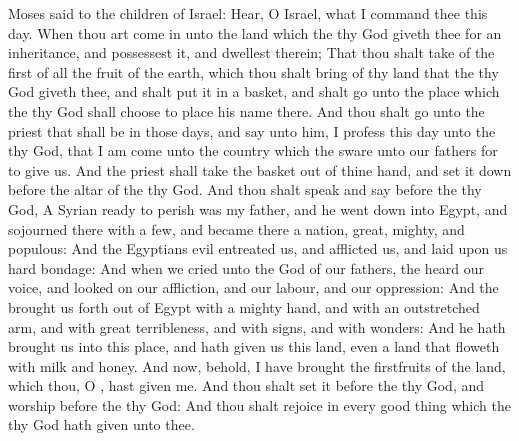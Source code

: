 \vspace{-0.33\baselineskip}


\vspace{-0.1515\baselineskip}

 Moses said to the children of Israel: Hear, O Israel, what I command thee this day. When thou art come in unto the land which the  thy God giveth thee for an inheritance, and possessest it, and dwellest therein; That thou shalt take of the first of all the fruit of the earth, which thou shalt bring of thy land that the  thy God giveth thee, and shalt put it in a basket, and shalt go unto the place which the  thy God shall choose to place his name there. And thou shalt go unto the priest that shall be in those days, and say unto him, I profess this day unto the  thy God, that I am come unto the country which the  sware unto our fathers for to give us. And the priest shall take the basket out of thine hand, and set it down before the altar of the  thy God. And thou shalt speak and say before the  thy God, A Syrian ready to perish was my father, and he went down into Egypt, and sojourned there with a few, and became there a nation, great, mighty, and populous: And the Egyptians evil entreated us, and afflicted us, and laid upon us hard bondage: And when we cried unto the  God of our fathers, the  heard our voice, and looked on our affliction, and our labour, and our oppression: And the  brought us forth out of Egypt with a mighty hand, and with an outstretched arm, and with great terribleness, and with signs, and with wonders: And he hath brought us into this place, and hath given us this land, even a land that floweth with milk and honey. And now, behold, I have brought the firstfruits of the land, which thou, O , hast given me. And thou shalt set it before the  thy God, and worship before the  thy God: And thou shalt rejoice in every good thing which the  thy God hath given unto thee.


\vspace{-0.34\baselineskip}

